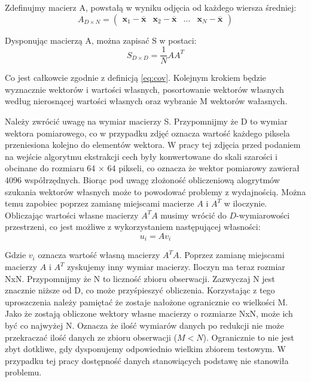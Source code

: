 \documentclass[oneside, eng]{mgr}
\newcommand{\bb}{\textbf}
\begin{document}
Zdefinujmy macierz A, powstałą w wyniku odjęcia od każdego wiersza średniej:
\begin{equation}
	A_{D \times N} = 
	\left( \begin{array}{llll}
	\bb{x}_1 - \overline{\bb{x}} & \bb{x}_2 - \overline{\bb{x}} & \ldots & \bb{x}_N - \overline{\bb{x}}
	\end{array} \right)
\end{equation}


Dysponując macierzą A, można zapisać S w postaci:
\begin{equation}
	S_{D \times D} = \frac{1}{N} A A^T
\end{equation}

Co jest całkowcie zgodnie z definicją \ref{eq:cov}. Kolejnym krokiem będzie wyznacznie wektorów i wartości własnych, posortowanie wektorów własnych według nierosnącej wartości własnych oraz wybranie M wektorów wałasnych. 

Należy zwrócić uwagę na wymiar macierzy S. Przypomnijmy że D to wymiar wektora pomiarowego, co w przypadku zdjęć oznacza wartość każdego piksela przeniesiona kolejno do elementów wektora. W pracy tej zdjęcia przed podaniem na wejście algorytmu ekstrakcji cech były konwertowane do skali szarości i obcinane do rozmiaru 64 $\times$ 64 pikseli, co oznacza że wektor pomiarowy zawierał 4096 współrzędnych. Biorąc pod uwagę złożoność obliczeniową alogrytmów szukania wektorów własnych może to powodować problemy z wydajnością. Można temu zapobiec poprzez zamianę miejscami macierze $A$ i $A^T$ w iloczynie. Obliczając wartości własne macierzy $A^T A$ musimy wrócić do $D$-wymiarowości przestrzeni, co jest możliwe z wykorzystaniem następującej własności:
\begin{equation}
	u_i = A v_i
\end{equation}

Gdzie $v_i$ oznacza wartość własną macierzy $A^T A$. Poprzez zamianę miejscami macierzy $A$ i $A^T$ zyskujemy inny wymiar macierzy. Iloczyn ma teraz rozmiar NxN. Przypomnijmy że N to liczność zbioru obserwacji. Zazwyczaj N jest znacznie niższe od D, co może przyśpieszyć obliczenia. Korzystając z tego uproszczenia należy pamiętać że zostaje nałożone ogranicznie co wielkości M. Jako że zostają obliczone wektory własne macierzy o rozmiarze NxN, może ich być co najwyżej N. Oznacza że ilość wymiarów danych po redukcji nie może przekraczać ilość danych ze zbioru obserwacji ($M < N$). Ogranicznie to nie jest zbyt dotkliwe, gdy dysponujemy odpowiednio wielkim zbiorem testowym. W przypadku tej pracy dostępność danych stanowiących podstawę nie stanowiła problemu.
\end{document}
